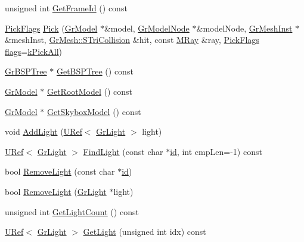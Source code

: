 \begin{CompactItemize}
unsigned int \hyperlink{class_gr_scene_fbe441d52737edbdf48e2f0925129ace}{GetFrameId} () const 
\item 
\hyperlink{class_gr_scene_7645ba831bfac8f4543f59ff7b2c63bd}{PickFlags} \hyperlink{class_gr_scene_55ff6809eccf8aee6efbe9093902e241}{Pick} (\hyperlink{class_gr_model}{GrModel} $\ast$\&model, \hyperlink{class_gr_model_node}{GrModelNode} $\ast$\&modelNode, \hyperlink{class_gr_mesh_inst}{GrMeshInst} $\ast$\&meshInst, \hyperlink{struct_gr_mesh_1_1_s_tri_collision}{GrMesh::STriCollision} \&hit, const \hyperlink{class_m_ray}{MRay} \&ray, \hyperlink{class_gr_scene_7645ba831bfac8f4543f59ff7b2c63bd}{PickFlags} \hyperlink{_u_t_message_8h_0a3c0b351ab09281b662a9ff4f900a53}{flags}=\hyperlink{class_gr_scene_a8cf807b21fc873fd6158af7ca6da3e5}{kPickAll})
\item 
\hyperlink{class_gr_b_s_p_tree}{GrBSPTree} $\ast$ \hyperlink{class_gr_scene_0b35a3a91dac9b66a606cedb305e6e03}{GetBSPTree} () const 
\item 
\hyperlink{class_gr_model}{GrModel} $\ast$ \hyperlink{class_gr_scene_77053ce45ce06b5253e28c63660bbe20}{GetRootModel} () const 
\item 
\hyperlink{class_gr_model}{GrModel} $\ast$ \hyperlink{class_gr_scene_b6bba978374af9a4e07fc144d7aaee4d}{GetSkyboxModel} () const 
\item 
void \hyperlink{class_gr_scene_edba5aec2c8d98d63416dd3be618a427}{AddLight} (\hyperlink{class_u_ref}{URef}$<$ \hyperlink{class_gr_light}{GrLight} $>$ light)
\item 
\hyperlink{class_u_ref}{URef}$<$ \hyperlink{class_gr_light}{GrLight} $>$ \hyperlink{class_gr_scene_72b23cf24995f4e8ed564694e47111e5}{FindLight} (const char $\ast$\hyperlink{glext__bak_8h_58c2a664503e14ffb8f21012aabff3e9}{id}, int cmpLen=-1) const 
\item 
bool \hyperlink{class_gr_scene_d164195244a057f9a27808fed5e49a97}{RemoveLight} (const char $\ast$\hyperlink{glext__bak_8h_58c2a664503e14ffb8f21012aabff3e9}{id})
\item 
bool \hyperlink{class_gr_scene_56a9545a1667c9dae82eecb89c4a60d7}{RemoveLight} (\hyperlink{class_gr_light}{GrLight} $\ast$light)
\item 
unsigned int \hyperlink{class_gr_scene_0aecbaefcc7f4c2e7f03f9103df539ea}{GetLightCount} () const 
\item 
\hyperlink{class_u_ref}{URef}$<$ \hyperlink{class_gr_light}{GrLight} $>$ \hyperlink{class_gr_scene_afe37dfc9c622a8e711da54913de9f82}{GetLight} (unsigned int idx) const 
\item 

\end{CompactItemize}
